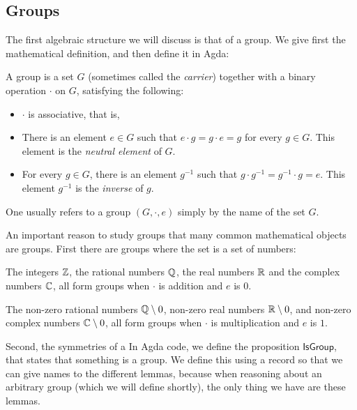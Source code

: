 \documentclass{article}
\newcommand{\Conid}[1]{\mathit{#1}}
\newcommand{\Varid}[1]{\mathit{#1}}
\renewcommand\Varid[1]{\mathord{\textsf{#1}}}
\let\Conid\Varid
\begin{document}
\subsection{Groups}
The first algebraic structure we will discuss is that of a group. We give first the mathematical definition, and then define it in Agda:
\begin{Definition}
A group is a set $G$ (sometimes called the \emph{carrier}) together with a binary operation $\cdot$ on $G$, satisfying the following:
\begin{itemize}
\item $\cdot$ is associative, that is, 
\item There is an element $e \in G$ such that $e \cdot g = g \cdot e = g$ for every $g \in G$. This element is the \emph{neutral element} of $G$.
\item For every $g \in G$, there is an element $g^{-1}$ such that $g \cdot g^{-1} = g^{-1} \cdot g = e$. This element $g^{-1}$ is the \emph{inverse} of $g$.
\end{itemize}
\end{Definition}
\begin{Remark}
One usually refers to a group $(G, \cdot, e)$ simply by the name of the set $G$.
\end{Remark}
An important reason to study groups that many common mathematical objects are groups. First there are groups where the set is a set of numbers:
\begin{Example}
  The integers $\mathbb{Z}$, the rational numbers $\mathbb{Q}$, the real numbers $\mathbb{R}$ and the complex numbers $\mathbb{C}$, all form groups when $\cdot$ is addition and $e$ is $0$.
\end{Example}
\begin{Example}
  The non-zero rational numbers $\mathbb{Q}\setminus{0}$, non-zero real numbers $\mathbb{R}\setminus{0}$, and non-zero complex numbers $\mathbb{C}\setminus{0}$, all form groups when $\cdot$ is multiplication and $e$ is $1$.
\end{Example}
Second, the symmetries of a 
In Agda code, we define the proposition \ensuremath{\Conid{IsGroup}}, that states that something is a group. We define this using a record  so that we can give names to the different lemmas, because when reasoning about an arbitrary group (which we will define shortly), the only thing we have are these lemmas.
\end{document}
